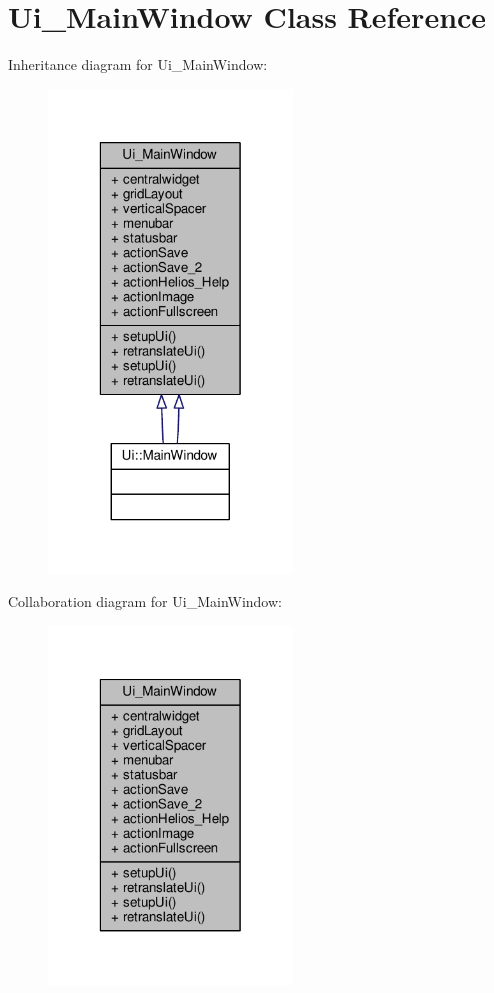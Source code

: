\hypertarget{class_ui___main_window}{\section{Ui\-\_\-\-Main\-Window Class Reference}
\label{class_ui___main_window}
}


Inheritance diagram for Ui\-\_\-\-Main\-Window\-:
\nopagebreak
\begin{figure}[H]
\begin{center}
\leavevmode
\includegraphics[width=184pt]{class_ui___main_window__inherit__graph}
\end{center}
\end{figure}


Collaboration diagram for Ui\-\_\-\-Main\-Window\-:
\nopagebreak
\begin{figure}[H]
\begin{center}
\leavevmode
\includegraphics[width=184pt]{class_ui___main_window__coll__graph}
\end{center}
\end{figure}
